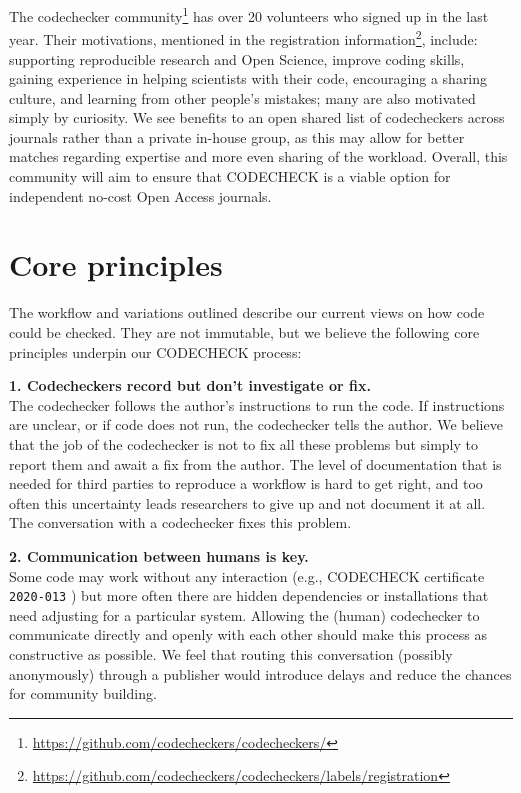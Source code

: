 \documentclass[12pt]{article}
\begin{document}
The codechecker
community\footnote{\href{https://github.com/codecheckers/codecheckers/}{https://github.com/codecheckers/codecheckers/}}
has over 20 volunteers who signed up in the last year.  Their
motivations, mentioned in the registration
information\footnote{\url{https://github.com/codecheckers/codecheckers/labels/registration}},
include: supporting reproducible research and Open Science, improve
coding skills, gaining experience in helping scientists with their
code, encouraging a sharing culture, and learning from other people's
mistakes; many are also motivated simply by curiosity.  We see
benefits to an open shared list of codecheckers across journals rather
than a private in-house group, as this may allow for better matches
regarding expertise and more even sharing of the workload.  Overall,
this community will aim to ensure that CODECHECK is a viable option
for independent no-cost Open Access journals.

\section*{Core principles}\label{core-principles}

The workflow and variations outlined describe our current
views on how code could be checked.  They are not immutable, but
we believe the following core principles underpin our CODECHECK
process:

\textbf{1. Codecheckers record but don't investigate or fix.} \\
The codechecker follows the author's instructions to run the code. If
instructions are unclear, or if code does not run, the codechecker
tells the author. We believe that the job of the codechecker is not to
fix all these problems but simply to report them and await a fix from
the author.  The level of documentation that is needed for third
parties to reproduce a workflow is hard to get right, and
too often this uncertainty leads researchers to give up and not
document it at all.  The conversation with a codechecker fixes this
problem.

\textbf{2. Communication between humans is key.} \\ 
Some code may
work without any interaction (e.g., CODECHECK certificate \texttt{2020-013}
\cite{cert-2020-013}) but more often there are hidden
dependencies or installations that need adjusting for a particular system.
Allowing the (human) codechecker to communicate
directly and openly with each other should make this process as
constructive as possible. We feel that routing this conversation
(possibly anonymously) through a publisher would introduce delays and
reduce the chances for community building.
\end{document}
